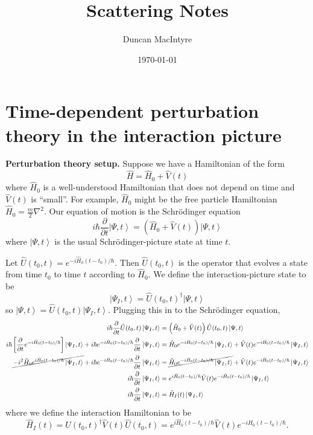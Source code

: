 \documentclass[11pt]{article}
\newcommand{\ket}[1]{\left|#1\right\rangle}
\newcommand{\op}[1]{\hat{#1}}
\theoremstyle{theorem}
\theoremstyle{remark}
\theoremstyle{step}
\theoremstyle{gap}
\begin{document}
\title{Scattering Notes}
\author{Duncan MacIntyre}
\date{\today}
\maketitle
\tableofcontents
\bigskip
\newpage

\section{Time-dependent perturbation theory in the interaction picture}

{\bf Perturbation theory setup.}
Suppose we have a Hamiltonian of the form \[\op{H} = \op{H}_0 + \op{V}(t)\]
where \(\op{H}_0\) is a well-understood Hamiltonian that does not depend on time and \(\op{V}(t)\) is ``small''. For example, \(\op{H}_0\) might be the free particle Hamiltonian \(\op{H}_0 = \frac{m}{2} \nabla^2\). Our equation of motion is the Schr\"odinger equation
\[i \hbar \frac{\partial}{\partial t} \ket{\Psi, t} = \left(\op{H}_0 + \op{V}(t)\right) \ket{\Psi, t}\]
where \(\ket{\Psi, t}\) is the usual Schr\"odinger-picture state at time \(t\).

Let \(\op{U}(t_0, t) = e^{-i\op{H}_0(t-t_0)/\hbar}\). Then \(\op{U}(t_0, t)\) is the operator that evolves a state from time \(t_0\) to time \(t\) according to \(\op{H}_0\). We define the interaction-picture state to be
\[\ket{\Psi_I, t} = \op{U}(t_0, t)^\dagger \ket{\Psi, t}\]
so \(\ket{\Psi, t} = \op{U}(t_0, t) \ket{\Psi_I, t}\).
Plugging this in to the Schr\"odinger equation,
\begin{align*}
i \hbar \frac{\partial}{\partial t} \op{U}(t_0, t)\ket{\Psi_I, t} &= \left(\op{H}_0 + \op{V}(t)\right) \op{U}(t_0, t)\ket{\Psi, t} \\
i \hbar \left[\frac{\partial}{\partial t} e^{-i\op{H}_0(t-t_0)/\hbar}\right] \ket{\Psi_I, t} + i \hbar e^{-i\op{H}_0(t-t_0)/\hbar} \frac{\partial}{\partial t} \ket{\Psi_I, t} &= \op{H}_0 e^{-i\op{H}_0(t-t_0)/\hbar}\ket{\Psi_I, t} + \op{V}(t) e^{-i\op{H}_0(t-t_0)/\hbar}\ket{\Psi_I, t} \\
\cancel{-i^2 \op{H}_0 e^{i\op{H}_0(t-t_0)/\hbar} \ket{\Psi_I, t}} + i \hbar e^{-i\op{H}_0(t-t_0)/\hbar} \frac{\partial}{\partial t} \ket{\Psi_I, t} &= \cancel{\op{H}_0 e^{-i\op{H}_0(t-t_0)/\hbar}\ket{\Psi_I, t}} + \op{V}(t) e^{-i\op{H}_0(t-t_0)/\hbar}\ket{\Psi_I, t} \\
 i \hbar \frac{\partial}{\partial t} \ket{\Psi_I, t} &= e^{i\op{H}_0(t-t_0)/\hbar}\op{V}(t) e^{-i\op{H}_0(t-t_0)/\hbar}\ket{\Psi_I, t} \\
 i \hbar \frac{\partial}{\partial t} \ket{\Psi_I, t} &= \op{H}_I(t)\ket{\Psi_I, t}
\end{align*}
where we define the interaction Hamiltonian to be
\[\op{H}_I(t) = \op{U}(t_0, t)^\dagger \op{V}(t)\op{U}(t_0, t) = e^{i\op{H}_0(t-t_0)/\hbar}\op{V}(t) e^{-i\op{H}_0(t-t_0)/\hbar}.\]
\end{document}
